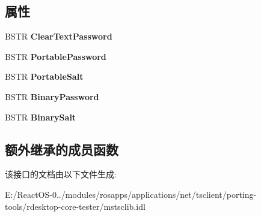 \subsection*{属性}
\begin{DoxyCompactItemize}
\item 
\mbox{\label{interface_m_s_t_s_c_lib_1_1_i_ms_tsc_non_scriptable_a4406fc9479efa8b20ad1d49193813720}} 
B\+S\+TR {\bfseries Clear\+Text\+Password}
\item 
\mbox{\label{interface_m_s_t_s_c_lib_1_1_i_ms_tsc_non_scriptable_a98ffde574bf9c2bb8e6049c5ad5cc604}} 
B\+S\+TR {\bfseries Portable\+Password}
\item 
\mbox{\label{interface_m_s_t_s_c_lib_1_1_i_ms_tsc_non_scriptable_ad428b136980a086c542a7f2dbc1b2ada}} 
B\+S\+TR {\bfseries Portable\+Salt}
\item 
\mbox{\label{interface_m_s_t_s_c_lib_1_1_i_ms_tsc_non_scriptable_a4b3309f8f8a192d74025b0904aef3e12}} 
B\+S\+TR {\bfseries Binary\+Password}
\item 
\mbox{\label{interface_m_s_t_s_c_lib_1_1_i_ms_tsc_non_scriptable_a78f1b70a4d402869ce662781a181bb9d}} 
B\+S\+TR {\bfseries Binary\+Salt}
\end{DoxyCompactItemize}
\subsection*{额外继承的成员函数}


该接口的文档由以下文件生成\+:\begin{DoxyCompactItemize}
\item 
E\+:/\+React\+O\+S-\/0../modules/rosapps/applications/net/tsclient/porting-\/tools/rdesktop-\/core-\/tester/mstsclib.\+idl\end{DoxyCompactItemize}
